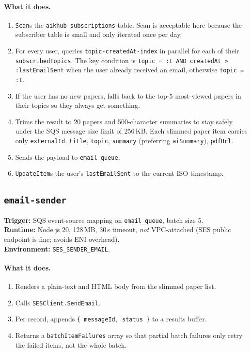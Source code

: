 \documentclass[11pt,a4paper]{article}
\begin{document}
\paragraph{What it does.}
\begin{enumerate}[leftmargin=*]
  \item \texttt{Scan}s the \texttt{aikhub-subscriptions} table. Scan is acceptable here because the subscriber table is small and only iterated once per day.
  \item For every user, queries \texttt{topic-createdAt-index} in parallel for each of their \texttt{subscribedTopics}. The key condition is \texttt{topic = :t AND createdAt > :lastEmailSent} when the user already received an email, otherwise \texttt{topic = :t}.
  \item If the user has no new papers, falls back to the top-5 most-viewed papers in their topics so they always get something.
  \item Trims the result to 20 papers and 500-character summaries to stay safely under the SQS message size limit of 256\,KB. Each slimmed paper item carries only \texttt{externalId}, \texttt{title}, \texttt{topic}, \texttt{summary} (preferring \texttt{aiSummary}), \texttt{pdfUrl}.
  \item Sends the payload to \texttt{email\_queue}.
  \item \texttt{UpdateItem}s the user's \texttt{lastEmailSent} to the current ISO timestamp.
\end{enumerate}

\subsection{\texttt{email-sender}}

\textbf{Trigger:} SQS event-source mapping on \texttt{email\_queue}, batch size 5. \\
\textbf{Runtime:} Node.js 20, 128\,MB, 30\,s timeout, \emph{not} VPC-attached (SES public endpoint is fine; avoids ENI overhead). \\
\textbf{Environment:} \texttt{SES\_SENDER\_EMAIL}.

\paragraph{What it does.}
\begin{enumerate}[leftmargin=*]
  \item Renders a plain-text and HTML body from the slimmed paper list.
  \item Calls \texttt{SESClient.SendEmail}.
  \item Per record, appends \texttt{\{ messageId, status \}} to a results buffer.
  \item Returns a \texttt{batchItemFailures} array so that partial batch failures only retry the failed items, not the whole batch.
\end{enumerate}
\end{document}
